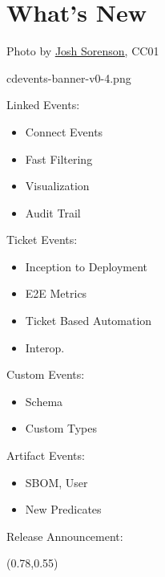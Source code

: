 \documentclass[aspectratio=169,11pt,hyperref={colorlinks=true}]{beamer}
\begin{document}
\section{What's New}
\begin{sectionwithpiclargecentral}{Photo by \href{https://unsplash.com/@joshsorenson}{\underline{Josh Sorenson}}, CC0}{1}
\end{sectionwithpiclargecentral}

\begin{tpicstripedframe}%
  {cdevents-banner-v0-4.png}
  {%
  Linked Events:
  \vspace{0.01\textheight}
  \begin{itemize}
    \item Connect Events
    \item Fast Filtering
    \item Visualization
    \item Audit Trail
  \end{itemize}
  }%
  {%
  Ticket Events:
  \vspace{0.01\textheight}
  \begin{itemize}
    \item Inception to Deployment
    \item E2E Metrics
    \item Ticket Based Automation
    \item Interop.
  \end{itemize}
  }%
  {%
  Custom Events:
  \vspace{0.01\textheight}
  \begin{itemize}
    \item Schema
    \item Custom Types
  \end{itemize}
  \vspace{0.03\textheight}
  Artifact Events:
  \vspace{0.01\textheight}
  \begin{itemize}
    \item SBOM, User
    \item New Predicates
  \end{itemize}
  }%
  {%
  Release Announcement:
  \begin{textblock*}{0.17\paperwidth}(0.78\paperwidth,0.55\paperheight)

\end{textblock*}}
\end{tpicstripedframe}
\end{document}
